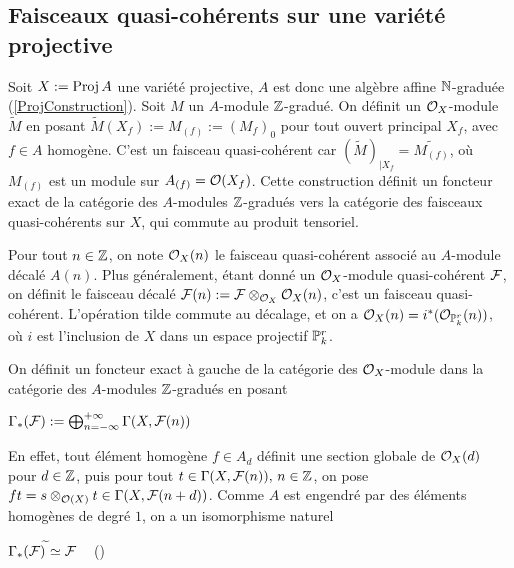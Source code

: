 \subsection{Faisceaux quasi-cohérents sur une variété projective}

\label{FQCProj}

Soit $X:=\operatorname{Proj} A$ une variété projective, $A$ est donc une algèbre affine $\mathbb{N}$-graduée (\ref{ProjConstruction}). Soit $M$ un $A$-module $\mathbb{Z}$-gradué. On définit un $\mathcal{O}_X$-module $\widetilde{M}$ en posant $\widetilde{M}(X_f):=M_{(f)}:=(M_f)_0$ pour tout ouvert principal $X_f$, avec $f\in A$ homogène. C'est un faisceau quasi-cohérent car $(\widetilde{M})_{|X_f}=\widetilde{M_{(f)}}$, où $M_{(f)}$ est un module sur $A_{(f)}=\mathcal{O}(X_f)$. Cette construction définit un foncteur exact de la catégorie des $A$-modules $\mathbb{Z}$-gradués vers la catégorie des faisceaux quasi-cohérents sur $X$, qui commute au produit tensoriel.

Pour tout $n\in \mathbb{Z}$, on note $\mathcal{O}_X(n)$ le faisceau quasi-cohérent associé au $A$-module décalé $A(n)$. Plus généralement, étant donné un $\mathcal{O}_X$-module quasi-cohérent $\mathcal{F}$, on définit le faisceau décalé $\mathcal{F}(n):=\mathcal{F}\otimes_{\mathcal{O}_X}\mathcal{O}_X(n)$, c'est un faisceau quasi-cohérent. L'opération tilde commute au décalage, et on a $\mathcal{O}_X(n)=i^*(\mathcal{O}_{\mathbb{P}_k^r}(n))$, où $i$ est l'inclusion de $X$ dans un espace projectif $\mathbb{P}_k^r$.

On définit un foncteur exact à gauche de la catégorie des $\mathcal{O}_X$-module dans la catégorie des $A$-modules $\mathbb{Z}$-gradués en posant 
\begin{center}
$\Gamma_*(\mathcal{F}):=\bigoplus_{n=-\infty}^{+\infty}\Gamma(X,\mathcal{F}(n))$
\end{center}
En effet, tout élément homogène $f\in A_d$ définit une section globale de $\mathcal{O}_X(d)$ pour $d\in \mathbb{Z}$, puis pour tout $t\in \Gamma(X,\mathcal{F}(n)),\, n\in\mathbb{Z}$, on pose $ft=s\otimes_{\mathcal{O}(X)} t\in \Gamma(X, \mathcal{F}(n+d))$. Comme $A$ est engendré par des éléments homogènes de degré $1$, on a un isomorphisme naturel 
\begin{center}
$\Gamma_*(\mathcal{F})^{\widetilde{}}\simeq \mathcal{F}\,\,\,\,\,$ (\cite[II.5.15]{Hartshorne})\end{center}

